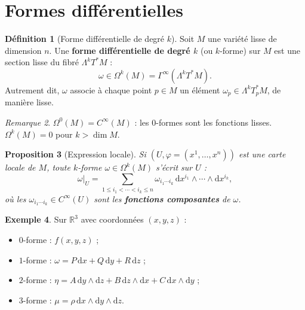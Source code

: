 \documentclass[12pt,a4paper,openany]{book}
\theoremstyle{definition}
\newtheorem{definition}{Définition}[chapter]
\newtheorem{exemple}[definition]{Exemple}
\theoremstyle{plain}
\newtheorem{proposition}[definition]{Proposition}
\theoremstyle{remark}
\newtheorem{remarque}[definition]{Remarque}
\newcommand{\R}{\mathbb{R}}
\newcommand{\dd}{\mathrm{d}}
\begin{document}
\section{Formes différentielles}\label{sec:formes-differentielles}

\begin{definition}[Forme différentielle de degré $k$]%
\label{def:forme-differentielle}
Soit $M$ une variété lisse de dimension $n$. Une \textbf{forme
différentielle de degré $k$} (ou $k$-forme) sur $M$ est une section
lisse du fibré $\Lambda^k T^*M$ :
\[
  \omega \in \Omega^k(M) = \Gamma^\infty(\Lambda^k T^*M).
\]
Autrement dit, $\omega$ associe à chaque point $p \in M$ un élément
$\omega_p \in \Lambda^k T_p^* M$, de manière lisse.
\end{definition}

\begin{remarque}\label{rem:0-formes}
$\Omega^0(M) = C^\infty(M)$ : les $0$-formes sont les fonctions lisses.
$\Omega^k(M) = 0$ pour $k > \dim M$.
\end{remarque}

\begin{proposition}[Expression locale]\label{prop:expression-locale-formes}%
Si $(U, \varphi = (x^1, \ldots, x^n))$ est une carte locale de $M$,
toute $k$-forme $\omega \in \Omega^k(M)$ s'écrit sur $U$ :
\[
  \omega\big|_U = \sum_{1 \leq i_1 < \cdots < i_k \leq n}
    \omega_{i_1 \cdots i_k}\, \dd x^{i_1} \wedge \cdots \wedge
    \dd x^{i_k},
\]
où les $\omega_{i_1 \cdots i_k} \in C^\infty(U)$ sont les
\textbf{fonctions composantes} de $\omega$.
\end{proposition}

\begin{exemple}\label{ex:formes-R3}
Sur $\R^3$ avec coordonnées $(x, y, z)$ :
\begin{itemize}
  \item $0$-forme : $f(x, y, z)$ ;
  \item $1$-forme : $\omega = P\,\dd x + Q\,\dd y + R\,\dd z$ ;
  \item $2$-forme :
    $\eta = A\,\dd y \wedge \dd z + B\,\dd z \wedge \dd x +
      C\,\dd x \wedge \dd y$ ;
  \item $3$-forme : $\mu = \rho\,\dd x \wedge \dd y \wedge \dd z$.
\end{itemize}
\end{exemple}
\end{document}

